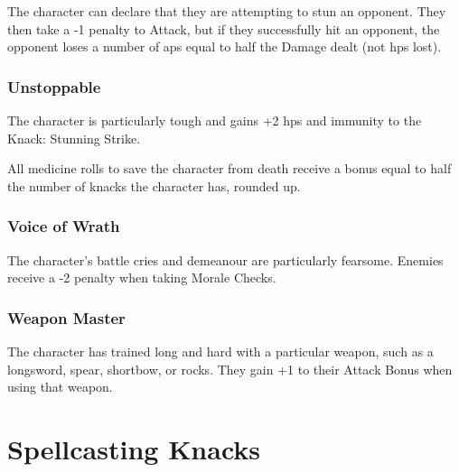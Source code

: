 \begin{multicols}{2}
The character can declare that they are attempting to stun an opponent.
They then take a -1 penalty to Attack, but if they successfully hit an opponent, the opponent loses a number of \glspl{ap} equal to half the Damage dealt (not \glspl{hp} lost).

\subsubsection{Unstoppable}

The character is particularly tough and gains +2 \glspl{hp} and immunity to the Knack: Stunning Strike.

All medicine rolls to save the character from death receive a bonus equal to half the number of knacks the character has, rounded up.

\subsubsection{Voice of Wrath}

The character's battle cries and demeanour are particularly fearsome.
Enemies receive a -2 penalty when taking Morale Checks.

\subsubsection{Weapon Master}

The character has trained long and hard with a particular weapon, such as a longsword, spear, shortbow, or rocks.
They gain +1 to their Attack Bonus when using that weapon.

\end{multicols}

\section{Spellcasting Knacks}

